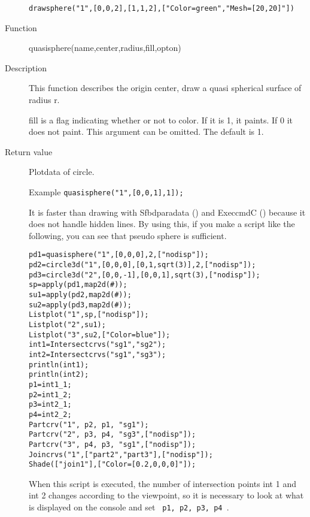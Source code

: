 \documentclass[papersize,a4paper,12pt]{article}
\begin{document}
\begin{description}
\verb|drawsphere("1",[0,0,2],[1,1,2],["Color=green","Mesh=[20,20]"])|

  \hspace{10mm}  


\hypertarget{quasisphere}{}
\item[Function] quasisphere(name,center,radius,fill,opton)
\item[Description] This function describes the origin center, draw a quasi spherical surface of radius r.

fill is a flag indicating whether or not to color.  If it is 1, it paints. If 0 it does not paint. This argument can be omitted. The default is 1.

\item[Return value] Plotdata of circle.

\vspace{\baselineskip}
Example \verb|quasisphere("1",[0,0,1],1]);|

  

It is faster than drawing with Sfbdparadata () and ExeccmdC () because it does not handle hidden lines. By using this, if you make a script like the following, you can see that pseudo sphere is sufficient.

\begin{verbatim}
pd1=quasisphere("1",[0,0,0],2,["nodisp"]);
pd2=circle3d("1",[0,0,0],[0,1,sqrt(3)],2,["nodisp"]);
pd3=circle3d("2",[0,0,-1],[0,0,1],sqrt(3),["nodisp"]);
sp=apply(pd1,map2d(#));
su1=apply(pd2,map2d(#));
su2=apply(pd3,map2d(#));
Listplot("1",sp,["nodisp"]);
Listplot("2",su1);
Listplot("3",su2,["Color=blue"]);
int1=Intersectcrvs("sg1","sg2");
int2=Intersectcrvs("sg1","sg3");
println(int1);
println(int2);
p1=int1_1;
p2=int1_2;
p3=int2_1;
p4=int2_2;
Partcrv("1", p2, p1, "sg1");
Partcrv("2", p3, p4, "sg3",["nodisp"]);
Partcrv("3", p4, p3, "sg1",["nodisp"]);
Joincrvs("1",["part2","part3"],["nodisp"]);
Shade(["join1"],["Color=[0.2,0,0,0]"]);
\end{verbatim}

  \hspace{10mm}  
 
When this script is executed, the number of intersection points int 1 and int 2 changes according to the viewpoint, so it is necessary to look at what is displayed on the console and set \verb | p1, p2, p3, p4 |.
 

\end{description}
\end{document}
